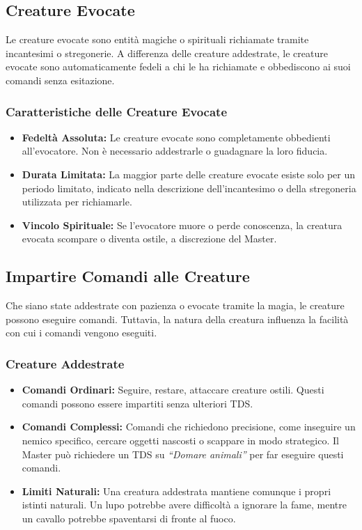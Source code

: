 \documentclass[../manuale_main.tex]{subfiles}
\begin{document}
\subsection*{Creature Evocate}

Le creature evocate sono entità magiche o spirituali richiamate tramite incantesimi o stregonerie. A differenza delle creature addestrate, le creature evocate sono automaticamente fedeli a chi le ha richiamate e obbediscono ai suoi comandi senza esitazione.

\subsubsection{Caratteristiche delle Creature Evocate}
\begin{itemize}
    \item \textbf{Fedeltà Assoluta:} Le creature evocate sono completamente obbedienti all'evocatore. Non è necessario addestrarle o guadagnare la loro fiducia.
    \item \textbf{Durata Limitata:} La maggior parte delle creature evocate esiste solo per un periodo limitato, indicato nella descrizione dell'incantesimo o della stregoneria utilizzata per richiamarle.
    \item \textbf{Vincolo Spirituale:} Se l'evocatore muore o perde conoscenza, la creatura evocata scompare o diventa ostile, a discrezione del Master.
\end{itemize}

\subsection*{Impartire Comandi alle Creature}

Che siano state addestrate con pazienza o evocate tramite la magia, le creature possono eseguire comandi. Tuttavia, la natura della creatura influenza la facilità con cui i comandi vengono eseguiti.

\subsubsection{Creature Addestrate}
\begin{itemize}
    \item \textbf{Comandi Ordinari:} Seguire, restare, attaccare creature ostili. Questi comandi possono essere impartiti senza ulteriori TDS.
    \item \textbf{Comandi Complessi:} Comandi che richiedono precisione, come inseguire un nemico specifico, cercare oggetti nascosti o scappare in modo strategico. Il Master può richiedere un TDS su \emph{``Domare animali''} per far eseguire questi comandi.
    \item \textbf{Limiti Naturali:} Una creatura addestrata mantiene comunque i propri istinti naturali. Un lupo potrebbe avere difficoltà a ignorare la fame, mentre un cavallo potrebbe spaventarsi di fronte al fuoco.
\end{itemize}
\end{document}
